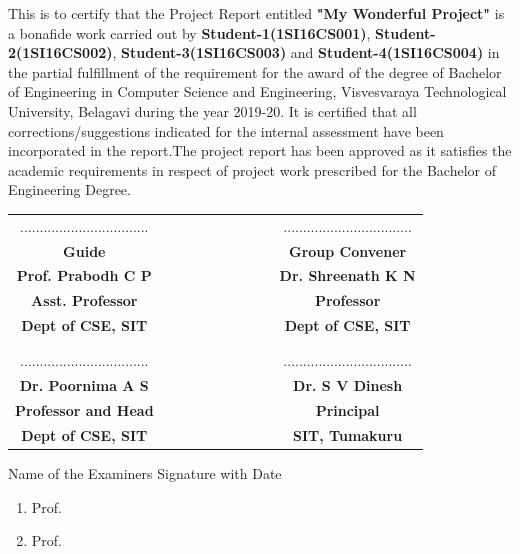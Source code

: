 \begin{large}
This is to certify that the Project Report entitled 
\textbf{"My Wonderful Project"} 
is a bonafide work carried out by 
\textbf{Student-1(1SI16CS001)}, 
\textbf{Student-2(1SI16CS002)}, 
\textbf{Student-3(1SI16CS003)} 
and 
\textbf{Student-4(1SI16CS004)} 
in the partial fulfillment of the requirement for the award of 
the degree of Bachelor of Engineering in Computer Science and Engineering, 
Visvesvaraya Technological University, Belagavi during the year 2019-20. 
It is certified that all corrections/suggestions indicated for the internal 
assessment have been incorporated in the report.The project report has been 
approved as it satisfies the academic requirements in respect of project 
work prescribed for the Bachelor of Engineering Degree.
\end{large}
\vfill
\vfill
\vfill

\begin{table}[h!]
\centering
\begin{tabular}{cccccccccc}
.................................&&&&&&&&& .................................\\
\textbf{{\footnotesize Guide}} &&&&&&&&&\textbf{{\footnotesize Group Convener}}\\
\textbf{Prof. Prabodh C P}&&&&&&&&& \textbf{Dr. Shreenath K N} \\
\textbf{{\footnotesize Asst. Professor}} &&&&&&&&& \textbf{{\footnotesize Professor}}\\
\textbf{{\footnotesize Dept of CSE, SIT}} &&&&&&&&& \textbf{{\footnotesize Dept of CSE, SIT}}\\
\\
\\
.................................&&&&&&&&& .................................\\
\textbf{Dr. Poornima A S} &&&&&&&&&  \textbf{Dr. S V Dinesh} \\ 
\textbf{{\footnotesize Professor and Head}} &&&&&&&&&  \textbf{{\footnotesize Principal}} \\
\textbf{{\footnotesize Dept of CSE, SIT}} &&&&&&&&&  \textbf{{\footnotesize SIT, Tumakuru}}\\

\end{tabular} 

\end{table}
Name of the Examiners	\hfill	Signature with Date
\begin{small}
\begin{enumerate}
\item Prof.
\item Prof.
\end{enumerate}
\end{small}
